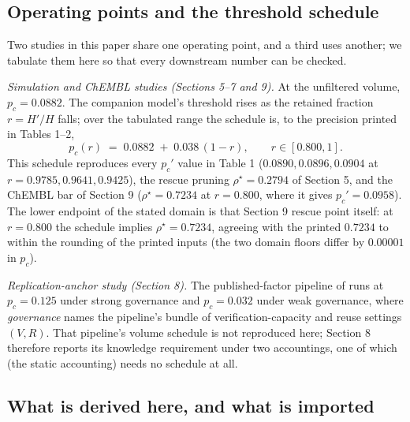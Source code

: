\documentclass[11pt]{article}
\begin{document}
\subsection{Operating points and the threshold schedule}

Two studies in this paper share one operating point, and a third uses
another; we tabulate them here so that every downstream number can be
checked.

\emph{Simulation and ChEMBL studies (Sections 5--7 and 9).} At the
unfiltered volume, $p_c = 0.0882$. The companion model's threshold rises as
the retained fraction $r = H'/H$ falls; over the tabulated range the
schedule is, to the precision printed in Tables 1--2,
\begin{equation}
p_c(r) \;=\; 0.0882 \;+\; 0.038\,(1 - r), \qquad r \in [0.800, 1].
\label{eq:schedule}
\end{equation}
This schedule reproduces every $p_c'$ value in Table 1
($0.0890, 0.0896, 0.0904$ at $r = 0.9785, 0.9641, 0.9425$), the rescue
pruning $\rho^\star = 0.2794$ of Section 5, and the ChEMBL bar of Section 9
($\rho^\star = 0.7234$ at $r = 0.800$, where it gives $p_c' = 0.0958$).
The lower endpoint of the stated domain is that Section 9 rescue point
itself: at $r = 0.800$ the schedule implies $\rho^\star = 0.7234$, agreeing
with the printed $0.7234$ to within the rounding of the printed inputs
(the two domain floors differ by $0.00001$ in $p_c$).

\emph{Replication-anchor study (Section 8).} The published-factor pipeline
of \cite{hou} runs at $p_c = 0.125$ under strong governance and
$p_c = 0.032$ under weak governance, where \emph{governance} names the
pipeline's bundle of verification-capacity and reuse settings $(V, R)$.
That pipeline's volume schedule is not reproduced here; Section 8 therefore
reports its knowledge requirement under two accountings, one of which (the
static accounting) needs no schedule at all.

\subsection{What is derived here, and what is imported}
\end{document}
